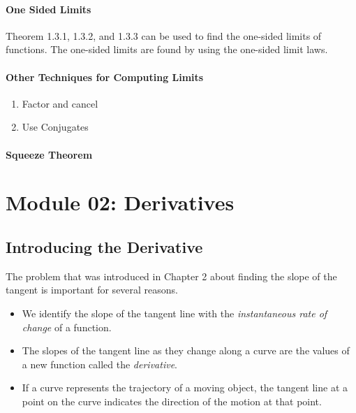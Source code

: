\documentclass{report}
\begin{document}
\newpage

\subsubsection{One Sided Limits}
Theorem 1.3.1, 1.3.2, and 1.3.3 can be used to find the one-sided limits of functions. The one-sided limits are found by using the one-sided limit laws.


\subsubsection{Other Techniques for Computing Limits}
\begin{enumerate}
    \item Factor and cancel
    \item Use Conjugates
\end{enumerate}

\subsubsection{Squeeze Theorem}



\newpage
\chapter{Module 02: Derivatives}
\section{Introducing the Derivative}
The problem that was introduced in Chapter 2 about finding the slope of the tangent is important for several reasons.
\begin{itemize}
    \item We identify the slope of the tangent line with the \emph{instantaneous rate of change} of a function.
    \item The slopes of the tangent line as they change along a curve are the values of a new function called the \emph{derivative}.
    \item If a curve represents the trajectory of a moving object, the tangent line at a point on the curve indicates the direction of the motion at that point.
\end{itemize}
\end{document}
